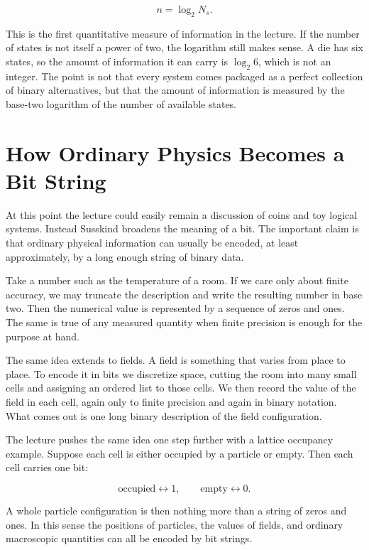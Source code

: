 \begin{equation}
n = \log_2 N_s.
\end{equation}

This is the first quantitative measure of information in the lecture. If the number of states is not itself a power of two, the logarithm still makes sense. A die has six states, so the amount of information it can carry is \(\log_2 6\), which is not an integer. The point is not that every system comes packaged as a perfect collection of binary alternatives, but that the amount of information is measured by the base-two logarithm of the number of available states.

\section{How Ordinary Physics Becomes a Bit String}

At this point the lecture could easily remain a discussion of coins and toy logical systems. Instead Susskind broadens the meaning of a bit. The important claim is that ordinary physical information can usually be encoded, at least approximately, by a long enough string of binary data.

Take a number such as the temperature of a room. If we care only about finite accuracy, we may truncate the description and write the resulting number in base two. Then the numerical value is represented by a sequence of zeros and ones. The same is true of any measured quantity when finite precision is enough for the purpose at hand.

The same idea extends to fields. A field is something that varies from place to place. To encode it in bits we discretize space, cutting the room into many small cells and assigning an ordered list to those cells. We then record the value of the field in each cell, again only to finite precision and again in binary notation. What comes out is one long binary description of the field configuration.

The lecture pushes the same idea one step further with a lattice occupancy example. Suppose each cell is either occupied by a particle or empty. Then each cell carries one bit:

\begin{equation}
\text{occupied} \longleftrightarrow 1,
\qquad
\text{empty} \longleftrightarrow 0.
\end{equation}

A whole particle configuration is then nothing more than a string of zeros and ones. In this sense the positions of particles, the values of fields, and ordinary macroscopic quantities can all be encoded by bit strings.

